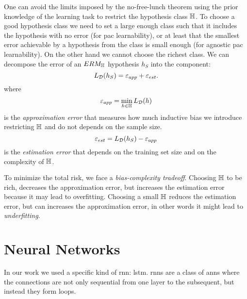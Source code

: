 One can avoid the limits imposed by the no-free-lunch theorem using
the prior knowledge of the learning task to restrict the hypothesis
class $\mathbb{H}$. To choose a good hypothesis class we need to set a
large enough class such that it includes the hypothesis with no error
(for \ac{pac} learnability), or at least that the smallest error
achievable by a hypothesis from the class is small enough (for
agnostic \ac{pac} learnability). On the other hand we cannot choose
the richest class. We can decompose the error of an $ERM_{\mathbb{H}}$
hypothesis $h_S$ into the component:
\begin{equation*}
  L_{\mathcal{D}}(h_S)=\varepsilon_{app}+\varepsilon_{est}.
\end{equation*}
where
\begin{equation*}
  \varepsilon_{app}=\min_{h\in\mathbb{H}}L_{\mathcal{D}}(h)
\end{equation*}
is the \emph{approximation error} that measures how much inductive
bias we 
introduce restricting $\mathbb{H}$ and do not depends on the sample size.
\begin{equation*}
  \varepsilon_{est}=L_{\mathcal{D}}(h_S)-\varepsilon_{app}
\end{equation*}
is the \emph{estimation error} that depends on the training set size
and on the complexity of $\mathbb{H}$.

To minimize the total risk, we face a \emph{bias-complexity
  tradeoff}. Choosing $\mathbb{H}$ to be rich, decreases the approximation
error, but increases the estimation error because it may lead to
overfitting. Choosing a small $\mathbb{H}$ reduces the estimation error,
but can increases the approximation error, in other words it might
lead to \emph{underfitting}.

\section{Neural Networks}
In our work we used a specific kind of \ac{rnn}: \ac{lstm}.
\acp{rnn} are a class of \acp{ann} where the connections are not only
sequential from one layer to the subsequent, but instead they form
loops. 

